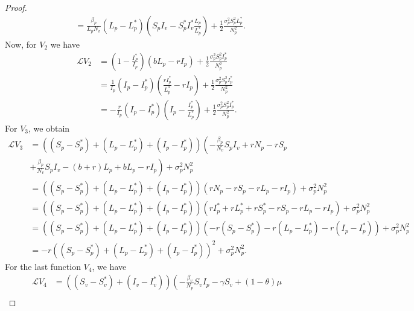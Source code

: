 \begin{proof}
\begin{align*}
			&=
				\frac{\beta_p}{L_pN_v}
				\left(
					L_p - L_p^*
				\right)
				\left(
					S_pI_v - S_p ^ *I_v^*
					\frac{L_p}{L_p^*}
				\right) + 
				\frac{1}{2}
				\frac{\sigma_p^2 S_p^2 L_p^*}{N_p^2}.
	\end{align*}
%
Now, for $V_2$ we have
%
	\begin{align*}
		\mathcal{L}V_2 
			&= 
				\left(
					1 - 
					\frac{I_P^*}{I_p}
				\right)
				\left(
					bL_p - r I_p 
				\right) + 
				\frac{1}{2}
				\frac{\sigma_p^2 S_p^2 I_p^*}{N_p^2}
			\\
			&= 
				\frac{1}{I_p}
				(I_p-I_p^*)
				\left(
					\frac{rI_p^*}{L_p^*} - 
					rI_p
				\right) + 
				\frac{1}{2}
				\frac{\sigma_p^2 S_p^2 I_p^*}{N_p^2}
			\\
			&=
				-\frac{r}{I_p} (I_p - I_p ^ *)
				\left(I_p - \frac{I_p ^* }{L_p^*}
				\right) + 
				\frac{1}{2} 
				\frac{\sigma_p^2 S_p^2 I_p ^ *}{N_p^2}.
	\end{align*}
	For $V_3$, we obtain
	\begin{align*}
		\mathcal{L}V_3
			&= 
				\left(
					(S_p - S_p ^* ) + 
					(L_p - L_p ^* ) +
					(I_p - I_p ^*)
				\right)
				\left(
					-\frac{\beta_p}{N_v}S_pI_v + 
					r N_p - rS_p 
				\right.\\
			&+
				\left.
					\frac{\beta_p}{N_v} 
					S_pI_v - (b+r)L_p + bL_p-rI_p
				\right) + 
				\sigma_p^2N_p^2
				\\
			&=
				\left(
					(S_p - S_p^*) + 
					(L_p - L_p^*) + 
					(I_p - I_p^*)
				\right)
				( r N_p - r S_p - r L_p - r I_p) + 
				\sigma_p^2N_p^2
			\\
			&=
				\left(
					(S_p - S_p ^*) + 
					(L_p - L_p ^*) + 
					(I_p - I_p^*)
				\right)
				( r I_p ^* + r L_p^* + rS_p^* - rS_p - r L_p-r I_p) + 
				\sigma_p^2 N_p^2
			\\
			&=
				\left(
					(S_p - S_p ^*) + 
					(L_p - L_p ^*) +
					(I_p - I_p ^*)
				\right)
				(
					-r (S_p - S_p ^*) -
					r (L_p - L_p^*) - 
					r(I_p-I_p^*)
				) + 
				\sigma_p^2 N_p^2
			\\
			&=
				-r
				\left(
					(S_p - S_p ^*) + 
					(L_p - L_p ^*) +
					(I_p - I_p^*)
				\right) ^ 2 + 
				\sigma_p^2 N_p^2.
	\end{align*}
	For the last function $V_4$, we have
	\begin{align*}
		\mathcal{L}V_4
			&= 
				\left(
					(S_v - S_v ^*) + 
					(I_v - I_v ^*)
				\right)
				\left( - 
					\frac{\beta_v}{N_p} S_vI_p -
					\gamma S_v + 
					(1 - \theta) 
					\mu 
				\right.\\

\end{align*}
\end{proof}
